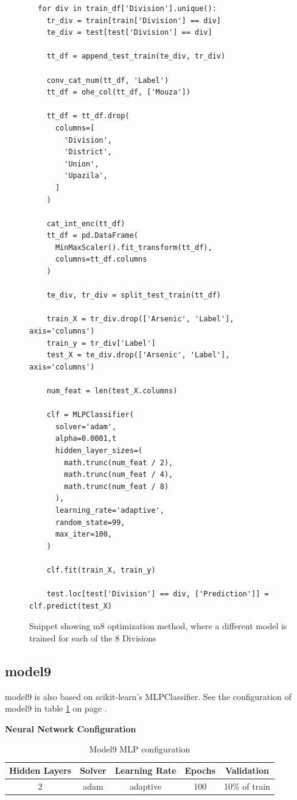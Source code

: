 \begin{figure}[h]
    \begin{verbatim}
  for div in train_df['Division'].unique():
    tr_div = train[train['Division'] == div]
    te_div = test[test['Division'] == div]
    
    tt_df = append_test_train(te_div, tr_div)
    
    conv_cat_num(tt_df, 'Label')
    tt_df = ohe_col(tt_df, ['Mouza'])
    
    tt_df = tt_df.drop(
      columns=[
        'Division',
        'District',
        'Union',
        'Upazila',
      ]
    )
    
    cat_int_enc(tt_df)
    tt_df = pd.DataFrame(
      MinMaxScaler().fit_transform(tt_df), 
      columns=tt_df.columns
    )
    
    te_div, tr_div = split_test_train(tt_df)
    
    train_X = tr_div.drop(['Arsenic', 'Label'], axis='columns')
    train_y = tr_div['Label']
    test_X = te_div.drop(['Arsenic', 'Label'], axis='columns')
    
    num_feat = len(test_X.columns)
    
    clf = MLPClassifier(
      solver='adam',
      alpha=0.0001,t
      hidden_layer_sizes=(
        math.trunc(num_feat / 2), 
        math.trunc(num_feat / 4), 
        math.trunc(num_feat / 8)
      ),
      learning_rate='adaptive',
      random_state=99,
      max_iter=100,
    )
    
    clf.fit(train_X, train_y)
    
    test.loc[test['Division'] == div, ['Prediction']] = clf.predict(test_X)
    \end{verbatim}
    \caption{Snippet showing m8 optimization method, where a different model is trained for each of the 8 Divisions}
    \label{fig:x m8_code}
\end{figure}

\subsection{model9}

model9 is also based on scikit-learn's MLPClassifier. See the configuration of model9 in table \ref{tbl:x m9_config} on page \pageref{tbl:x m9_config}.

\textbf{Neural Network Configuration}

\begin{table}
    \centering
    \begin{tabular}{c c c c c} 
         \toprule
         Hidden Layers & Solver & Learning Rate & Epochs & Validation \\ [0.5ex] 
         \midrule
         2 & adam & adaptive & 100 & 10\% of train\\ 
         \bottomrule
    \end{tabular}
    \caption{Model9 MLP configuration}
    \label{tbl:x m9_config}
\end{table}

